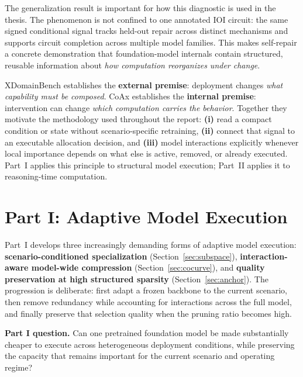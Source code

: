\documentclass[12pt,a4paper]{article}
\newcommand{\method}[1]{{\sffamily\bfseries\color{MethodBlue}#1}}
\newcommand{\XDB}{\method{XDomainBench}}
\newcommand{\SubspacePath}{\method{SubspacePath Pruner}}
\newcommand{\CoAx}{\method{CoAx}}
\def\method#1{#1}\def\XDB{XDomainBench}\def\SubspacePath{SubspacePath Pruner}%
\begin{document}
The generalization result is important for how this diagnostic is used in the thesis. The phenomenon is not confined to one annotated IOI circuit: the same signed conditional signal tracks held-out repair across distinct mechanisms and supports circuit completion across multiple model families. This makes self-repair a concrete demonstration that foundation-model internals contain structured, reusable information about \emph{how computation reorganizes under change}.

\begin{insightbox}
\XDB{} establishes the \textbf{external premise}: deployment changes \emph{what capability must be composed}. \CoAx{} establishes the \textbf{internal premise}: intervention can change \emph{which computation carries the behavior}. Together they motivate the methodology used throughout the report: \textbf{(i)} read a compact condition or state without scenario-specific retraining, \textbf{(ii)} connect that signal to an executable allocation decision, and \textbf{(iii)} model interactions explicitly whenever local importance depends on what else is active, removed, or already executed. Part~I applies this principle to structural model execution; Part~II applies it to reasoning-time computation.
\end{insightbox}

\clearpage
\section{Part I: Adaptive Model Execution}
\label{sec:execution}

Part~I develops three increasingly demanding forms of adaptive model execution: \textbf{scenario-conditioned specialization} (Section~\ref{sec:subspace}), \textbf{interaction-aware model-wide compression} (Section~\ref{sec:cocurve}), and \textbf{quality preservation at high structured sparsity} (Section~\ref{sec:anchor}). The progression is deliberate: first adapt a frozen backbone to the current scenario, then remove redundancy while accounting for interactions across the full model, and finally preserve that selection quality when the pruning ratio becomes high.

\begin{transitionbox}
\textbf{Part I question.} Can one pretrained foundation model be made substantially cheaper to execute across heterogeneous deployment conditions, while preserving the capacity that remains important for the current scenario and operating regime?
\end{transitionbox}
\end{document}
